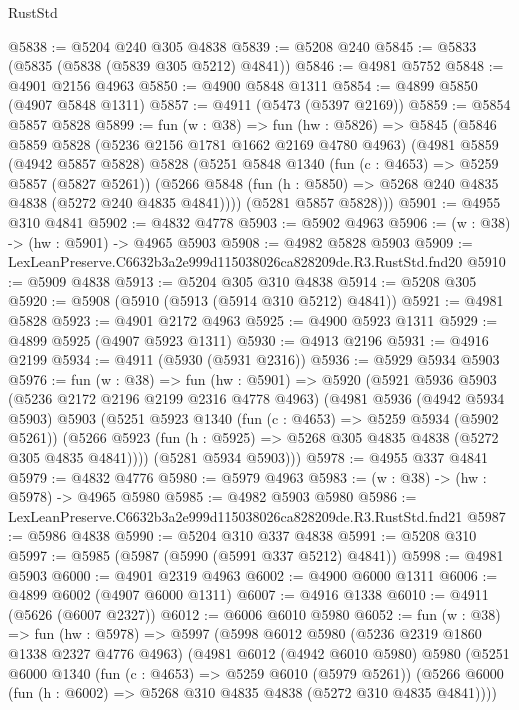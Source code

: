 \begin{lexlean}{RustStd}
\begin{coremodule}
@5838 := @5204 @240 @305 @4838
@5839 := @5208 @240
@5845 := @5833 (@5835 (@5838 (@5839 @305 @5212) @4841))
@5846 := @4981 @5752
@5848 := @4901 @2156 @4963
@5850 := @4900 @5848 @1311
@5854 := @4899 @5850 (@4907 @5848 @1311)
@5857 := @4911 (@5473 (@5397 @2169))
@5859 := @5854 @5857 @5828
@5899 := fun (w : @38) =>
  fun (hw : @5826) =>
  @5845
    (@5846
      @5859
      @5828
      (@5236 @2156 @1781 @1662 @2169 @4780 @4963)
      (@4981
        @5859
        (@4942 @5857 @5828)
        @5828
        (@5251
          @5848
          @1340
          (fun (c : @4653) => @5259 @5857 (@5827 @5261))
          (@5266 @5848 (fun (h : @5850) => @5268 @240 @4835 @4838 (@5272 @240 @4835 @4841))))
        (@5281 @5857 @5828)))
@5901 := @4955 @310 @4841
@5902 := @4832 @4778
@5903 := @5902 @4963
@5906 := (w : @38) -> (hw : @5901) -> @4965 @5903
@5908 := @4982 @5828 @5903
@5909 := LexLeanPreserve.C6632b3a2e999d115038026ca828209de.R3.RustStd.fnd20
@5910 := @5909 @4838
@5913 := @5204 @305 @310 @4838
@5914 := @5208 @305
@5920 := @5908 (@5910 (@5913 (@5914 @310 @5212) @4841))
@5921 := @4981 @5828
@5923 := @4901 @2172 @4963
@5925 := @4900 @5923 @1311
@5929 := @4899 @5925 (@4907 @5923 @1311)
@5930 := @4913 @2196
@5931 := @4916 @2199
@5934 := @4911 (@5930 (@5931 @2316))
@5936 := @5929 @5934 @5903
@5976 := fun (w : @38) =>
  fun (hw : @5901) =>
  @5920
    (@5921
      @5936
      @5903
      (@5236 @2172 @2196 @2199 @2316 @4778 @4963)
      (@4981
        @5936
        (@4942 @5934 @5903)
        @5903
        (@5251
          @5923
          @1340
          (fun (c : @4653) => @5259 @5934 (@5902 @5261))
          (@5266 @5923 (fun (h : @5925) => @5268 @305 @4835 @4838 (@5272 @305 @4835 @4841))))
        (@5281 @5934 @5903)))
@5978 := @4955 @337 @4841
@5979 := @4832 @4776
@5980 := @5979 @4963
@5983 := (w : @38) -> (hw : @5978) -> @4965 @5980
@5985 := @4982 @5903 @5980
@5986 := LexLeanPreserve.C6632b3a2e999d115038026ca828209de.R3.RustStd.fnd21
@5987 := @5986 @4838
@5990 := @5204 @310 @337 @4838
@5991 := @5208 @310
@5997 := @5985 (@5987 (@5990 (@5991 @337 @5212) @4841))
@5998 := @4981 @5903
@6000 := @4901 @2319 @4963
@6002 := @4900 @6000 @1311
@6006 := @4899 @6002 (@4907 @6000 @1311)
@6007 := @4916 @1338
@6010 := @4911 (@5626 (@6007 @2327))
@6012 := @6006 @6010 @5980
@6052 := fun (w : @38) =>
  fun (hw : @5978) =>
  @5997
    (@5998
      @6012
      @5980
      (@5236 @2319 @1860 @1338 @2327 @4776 @4963)
      (@4981
        @6012
        (@4942 @6010 @5980)
        @5980
        (@5251
          @6000
          @1340
          (fun (c : @4653) => @5259 @6010 (@5979 @5261))
          (@5266 @6000 (fun (h : @6002) => @5268 @310 @4835 @4838 (@5272 @310 @4835 @4841))))

\end{coremodule}
\end{lexlean}
